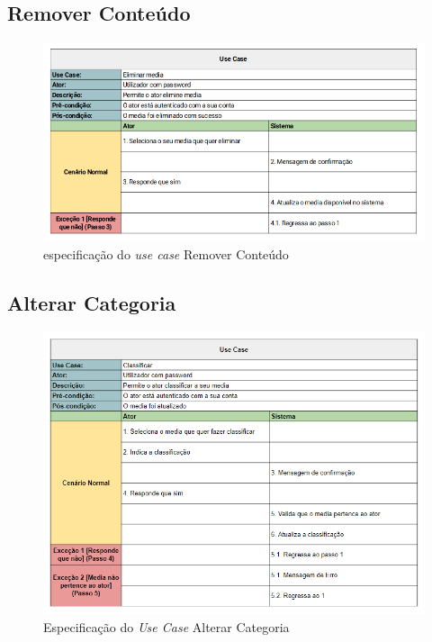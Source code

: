 \documentclass[a4paper]{report}
\begin{document}
\subsection{Remover Conteúdo}

\begin{figure}[H]
	\centering 
    \includegraphics[width=\textwidth]{images/Eliminar_media.png}  
    \caption{especificação do \emph{use case} Remover Conteúdo}
\end{figure}

\subsection{Alterar Categoria}

\begin{figure}[H]
	\centering 
    \includegraphics[width=\textwidth]{images/Classificar.png}  
    \caption{Especificação do \emph{Use Case} Alterar Categoria}
\end{figure}
\end{document}
